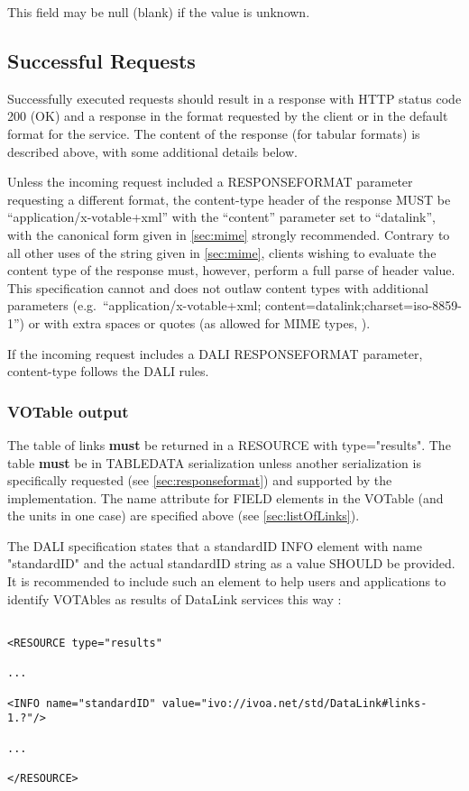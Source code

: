 \documentclass[11pt,a4paper]{ivoa}
\newcommand{\attval}[2]{#1={\allowbreak}{"}#2{"}}
\begin{document}
This field may be null (blank) if the value is unknown.

\subsection{Successful Requests}
\label{sec:successfulRequests}

Successfully executed requests should result in a response with HTTP
status code 200 (OK) and a response in the format requested by the client
or in the default format for the service. The content of the response
(for tabular formats) is described above,
with some additional details below.

Unless the incoming request included a RESPONSEFORMAT parameter requesting
a different format, the content-type header of the response MUST be
``application/x-votable+xml'' with the
``content'' parameter set to ``datalink'',
with the canonical form given in \ref{sec:mime}
strongly recommended. Contrary to
all other uses of the string given in \ref{sec:mime},
clients wishing to evaluate
the content type of the response must, however, perform a full parse
of header value. This specification cannot and does not outlaw content
types with additional parameters
(e.g.\ ``application/x-votable+xml; content=datalink;charset=iso-8859-1'')
or with extra spaces or quotes
(as allowed for MIME types, \citet{std:RFC2045}).

If the incoming request includes a DALI RESPONSEFORMAT parameter,
content-type follows the DALI rules.


\subsubsection{VOTable output}

The table of links {\bf must} be returned in a RESOURCE with
\attval{type}{results}. The table {\bf must} be in TABLEDATA serialization
unless another serialization is specifically requested
(see \ref{sec:responseformat})
and supported by the implementation.
The name attribute for FIELD elements in the VOTable
(and the units in one case) are specified above (see \ref{sec:listOfLinks}).

The DALI specification states that a standardID INFO element   with name "standardID" and the actual standardID string as a value SHOULD be provided.
It is recommended to include such an element to help users and applications to identify VOTAbles as results of DataLink services this way :
\begin{verbatim}

<RESOURCE type="results" 

... 

<INFO name="standardID" value="ivo://ivoa.net/std/DataLink#links-1.?"/> 

... 

</RESOURCE>
\end{verbatim}
\end{document}
